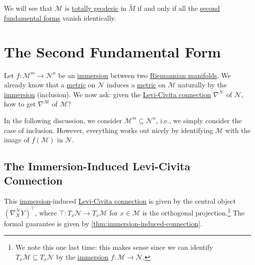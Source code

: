 \begin{remark}
	We will see that \(\mathcal{M} \) is \hyperref[def:totally-geodesic]{totally geodesic} in \(\widetilde{M} \) if and only if all the \hyperref[def:2nd-fundamental-form]{second fundamental forms} vanish identically.
\end{remark}

\section{The Second Fundamental Form}
Let \(f \colon \mathcal{M} ^m \to \mathcal{N} ^n\) be an \hyperref[def:immersion]{immersion} between two \hyperref[def:Riemannian-manifold]{Riemannian manifolds}. We already know that a \hyperref[def:Riemannian-metric]{metric} on \(\mathcal{N} \) induces a \hyperref[def:Riemannian-metric]{metric} on \(\mathcal{M} \) naturally by the \hyperref[def:immersion]{immersion} (inclusion). We now ask: given the \hyperref[def:Levi-Civita-connection]{Levi-Civita connection} \(\nabla ^\mathcal{N} \) of \(\mathcal{N} \), how to get \(\nabla ^\mathcal{M} \) of \(\mathcal{M} \)?

\begin{note}
	In the following discussion, we consider \(\mathcal{M} ^m \subseteq \mathcal{N} ^n\), i.e., we simply consider the case of inclusion. However, everything works out nicely by identifying \(\mathcal{M} \) with the image of \(f(\mathcal{M} )\) in \(\mathcal{N} \).
\end{note}

\subsection{The Immersion-Induced Levi-Civita Connection}
This \hyperref[def:immersion]{immersion}-induced \hyperref[def:Levi-Civita-connection]{Levi-Civita connection} is given by the central object \((\nabla ^\mathcal{N} _X Y)^{\top}\), where \(\top \colon T_x \mathcal{N} \to T_x \mathcal{M} \) for \(x\in \mathcal{M} \) is the orthogonal projection.\footnote{We note this one last time: this makes sense since we can identify \(T_x \mathcal{M} \subseteq T_x \mathcal{N} \) by the \hyperref[def:immersion]{immersion} \(f\colon \mathcal{M} \to \mathcal{N} \).} The formal guarantee is given by \autoref{thm:immersion-induced-connection}.

